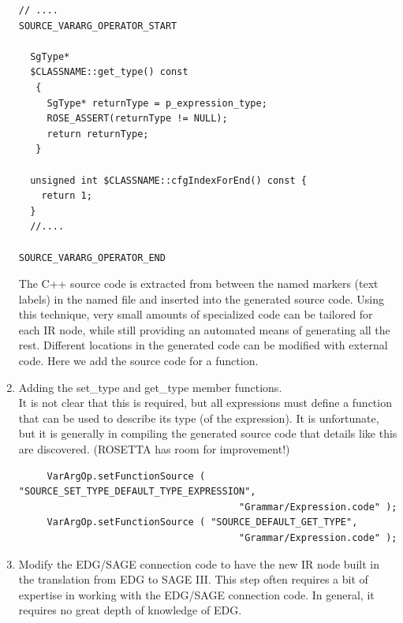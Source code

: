 \begin{enumerate}
{{\begin{verbatim}
// ....
SOURCE_VARARG_OPERATOR_START

  SgType*
  $CLASSNAME::get_type() const
   {
     SgType* returnType = p_expression_type;
     ROSE_ASSERT(returnType != NULL);
     return returnType;
   }

  unsigned int $CLASSNAME::cfgIndexForEnd() const {
    return 1;
  }
  //....

SOURCE_VARARG_OPERATOR_END
\end{verbatim} 
 }}
           The C++ source code is extracted 
           from between the named markers (text labels) in the named file and inserted 
           into the generated source code. Using this technique, very small amounts of 
           specialized code can be tailored for each IR node, while still providing an 
           automated means of generating all the rest.  Different locations in the
           generated code can be modified with external code. Here we add the source code
           for a function.

     \item Adding the set\_type and get\_type member functions. \\
           It is not clear that this is required, but all expressions must define a
           function that can be used to describe its type (of the expression).
           It is unfortunate, but it is generally in compiling the generated source code
           that details like this are discovered.  (ROSETTA has room for improvement!)
{\indent
{\mySmallFontSize
\begin{verbatim}
     VarArgOp.setFunctionSource ( "SOURCE_SET_TYPE_DEFAULT_TYPE_EXPRESSION", 
                                       "Grammar/Expression.code" );
     VarArgOp.setFunctionSource ( "SOURCE_DEFAULT_GET_TYPE",
                                       "Grammar/Expression.code" );
\end{verbatim} 
}}

     \item Modify the EDG/SAGE connection code to have the new IR node built in the
           translation from EDG to SAGE III.  This step often requires a bit of expertise
           in working with the EDG/SAGE connection code. In general, it requires no great
           depth of knowledge of EDG.


\end{enumerate}
